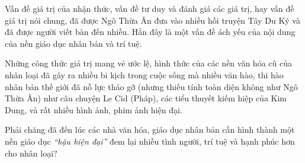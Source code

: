 Vấn đề giá trị của nhận thức, vấn đề tư duy và đánh giá các giá trị, hay vấn đề giá trị nói chung, đã được Ngô Thừa Ân đưa vào nhiều hồi truyện Tây Du Ký và đã được người viết bàn đến nhiều. Hẳn đây là một vấn đề ách yếu của nội dung của nền giáo dục nhân bản và trí tuệ.

Những công thức giá trị mang vẻ ước lệ, hình thức của các nền văn hóa cũ của nhân loại đã gây ra nhiều bi kịch trong cuộc sống mà nhiều văn hào, thi hào nhân bản thế giới đã nỗ lực tháo gỡ (nhưng thiếu tính toàn diện không như Ngô Thừa Ân) như câu chuyện Le Cid (Pháp), các tiểu thuyết kiếm hiệp của Kim Dung, và rất nhiều hình ảnh, phim ảnh hiện đại.

Phải chăng đã đến lúc các nhà văn hóa, giáo dục nhân bản cần hình thành một nền giáo dục \emph{``hậu hiện đại''} đem lại nhiều tình người, trí tuệ và hạnh phúc hơn cho nhân loại?
